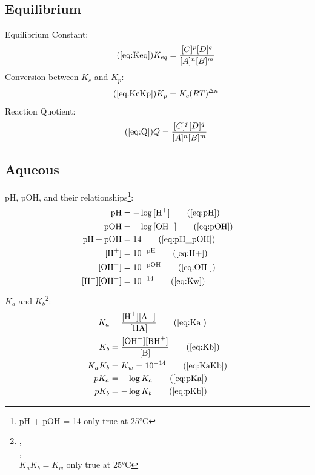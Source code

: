     \subsection{Equilibrium}
        Equilibrium Constant:
        \begin{equation}\tag{\ref{eq:Keq}}
             K_{eq} = \frac{[C]^p[D]^q}{[A]^n[B]^m}
        \end{equation}
        Conversion between $K_c$ and $K_p$:
        \begin{equation}\tag{\ref{eq:KcKp}}
            K_p = K_c(RT)^{\Delta n}
        \end{equation}
        Reaction Quotient:
        \begin{equation}\tag{\ref{eq:Q}}
            Q = \frac{[C]^p[D]^q}{[A]^n[B]^m}
        \end{equation}
    \subsection{Aqueous}
        pH, pOH, and their relationships\footnote{pH + pOH = 14 only true at 25°C}:
        \begin{align}
            \text{pH} &= -\log{[\ce{H+}]} \tag{\ref{eq:pH}}\\
            \text{pOH} &= -\log{[\ce{OH-}]} \tag{\ref{eq:pOH}}\\
            \text{pH} + \text{pOH} &= 14 \tag{\ref{eq:pH_pOH}}\\  
            [\ce{H+}] &= 10^{-\text{pH}} \tag{\ref{eq:H+}}\\
            [\ce{OH-}] &= 10^{-\text{pOH}} \tag{\ref{eq:OH-}}\\
            [\ce{H+}][\ce{OH-}] &= 10^{-14} \tag{\ref{eq:Kw}}
        \end{align}
        $K_a$ and $K_b$\footnote{,\\,\\$K_aK_b = K_w$ only true at 25°C}:
        \begin{align}
            K_a &= \frac{[\ce{H+}][\ce{A-}]}{[\ce{HA}]} \tag{\ref{eq:Ka}}\\
            K_b &= \frac{[\ce{OH-}][\ce{BH+}]}{[\ce{B}]}\tag{\ref{eq:Kb}}\\
            K_aK_b &= K_w = 10^{-14} \tag{\ref{eq:KaKb}}\\
            pK_a &= -\log{K_a} \tag{\ref{eq:pKa}}\\
            pK_b &= -\log{K_b} \tag{\ref{eq:pKb}}
        \end{align}
